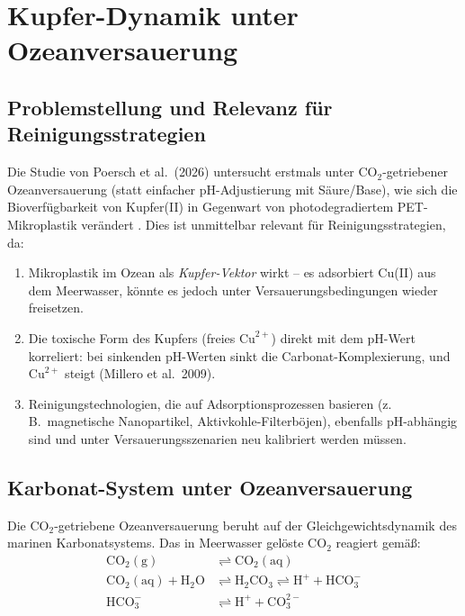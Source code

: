 ﻿\documentclass[12pt,a4paper]{article}
\theoremstyle{definition}
\theoremstyle{remark}
\newcommand{\MP}{Mikroplastik}
\begin{document}
\section{Kupfer-Dynamik unter Ozeanversauerung}
\label{sec:kupfer_dynamik}

\subsection{Problemstellung und Relevanz für Reinigungsstrategien}

Die Studie von Poersch et al.\ (2026) untersucht erstmals unter CO$_2$-getriebener
Ozeanversauerung (statt einfacher pH-Adjustierung mit Säure/Base), wie sich die
Bioverfügbarkeit von Kupfer(II) in Gegenwart von photodegradiertem PET-Mikroplastik
ver\"andert \cite{poersch2026copper}. Dies ist unmittelbar relevant für
Reinigungsstrategien, da:

\begin{enumerate}[leftmargin=*]
  \item \MP{} im Ozean als \textit{Kupfer-Vektor} wirkt -- es adsorbiert Cu(II)
    aus dem Meerwasser, k\"onnte es jedoch unter Versauerungsbedingungen
    wieder freisetzen.
  \item Die toxische Form des Kupfers (freies $\text{Cu}^{2+}$) direkt mit
    dem pH-Wert korreliert: bei sinkenden pH-Werten sinkt die Carbonat-Komplexierung,
    und $\text{Cu}^{2+}$ steigt (Millero et al.\ 2009).
  \item Reinigungstechnologien, die auf Adsorptionsprozessen basieren (z.\,B.\
    magnetische Nanopartikel, Aktivkohle-Filterböjen), ebenfalls pH-abh\"angig
    sind und unter Versauerungsszenarien neu kalibriert werden müssen.
\end{enumerate}

\subsection{Karbonat-System unter Ozeanversauerung}
\label{subsec:karbonat}

Die CO$_2$-getriebene Ozeanversauerung beruht auf der Gleichgewichtsdynamik des
marinen Karbonatsystems. Das in Meerwasser gel\"oste CO$_2$ reagiert gem\"a\ss{}:
\begin{align}
  \text{CO}_2(\text{g}) &\rightleftharpoons \text{CO}_2(\text{aq}) \label{eq:co2_dissolution}\\
  \text{CO}_2(\text{aq}) + \text{H}_2\text{O} &\rightleftharpoons
    \text{H}_2\text{CO}_3 \rightleftharpoons \text{H}^+ + \text{HCO}_3^-
    \label{eq:co2_hydration}\\
  \text{HCO}_3^- &\rightleftharpoons \text{H}^+ + \text{CO}_3^{2-}
    \label{eq:bicarbonate}
\end{align}
\end{document}
